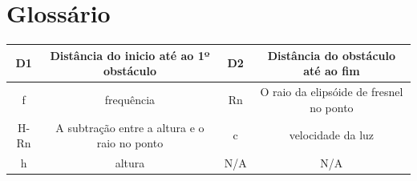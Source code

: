 \documentclass[a4paper,titlepage]{article}
\begin{document}
		\section{Glossário}
			\begin{tabular}{|c|c|c|c|}
			\hline D1 & Distância do inicio até ao 1º obstáculo & D2 & Distância do obstáculo até ao fim\\ 
			\hline f & frequência & Rn & O raio da elipsóide de fresnel no ponto \\ 
			\hline H-Rn & A subtração entre a altura e o raio no ponto & c & velocidade da luz \\ 
			\hline h & altura & N/A & N/A \\ 
			\hline 
		\end{tabular} 
\end{document}
